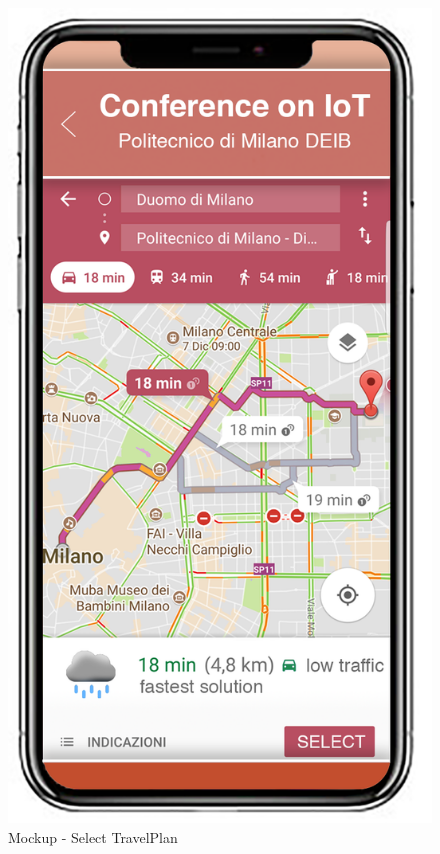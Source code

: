 \begin{figure}[H]	
	\centerline{\includegraphics[width=0.3\paperwidth]{Images/SelectTravelPlan}}
	\caption{Mockup - Select TravelPlan}
\end{figure}
